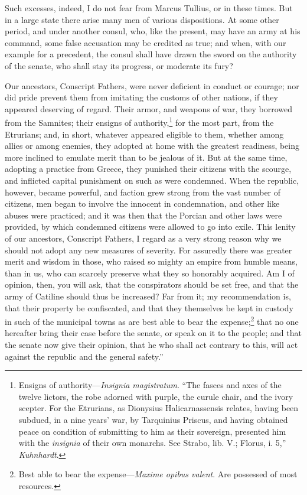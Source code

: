 Such excesses, indeed, I do not fear from Marcus Tullius, or in these
times. But in a large state there arise many men of various
dispositions. At some other period, and under another consul, who,
like the present, may have an army at his command, some false
accusation may be credited as true; and when, with our example for a
precedent, the consul shall have drawn the sword on the authority of
the senate, who shall stay its progress, or moderate its fury?

Our ancestors, Conscript Fathers, were never deficient in conduct or
courage; nor did pride prevent them from imitating the customs of
other nations, if they appeared deserving of regard. Their armor, and
weapons of war, they borrowed from the Samnites; their ensigns of
authority,\footnote{Ensigns of authority—\emph{Insignia magistratum}. ``The fasces and
axes of the twelve lictors, the robe adorned with purple, the curule
chair, and the ivory scepter. For the Etrurians, as Dionysius
Halicarnassensis relates, having been subdued, in a nine years' war,
by Tarquinius Priscus, and having obtained peace on condition of
submitting to him as their sovereign, presented him with the
\emph{insignia} of their own monarchs. See Strabo, lib. V.; Florus, i. 5,''
\emph{Kuhnhardt}.} for the most part, from the Etrurians; and, in short,
whatever appeared eligible to them, whether among allies or among
enemies, they adopted at home with the greatest readiness, being more
inclined to emulate merit than to be jealous of it. But at the same
time, adopting a practice from Greece, they punished their citizens
with the scourge, and inflicted capital punishment on such as were
condemned. When the republic, however, became powerful, and faction
grew strong from the vast number of citizens, men began to involve the
innocent in condemnation, and other like abuses were practiced; and it
was then that the Porcian and other laws were provided, by which
condemned citizens were allowed to go into exile. This lenity of our
ancestors, Conscript Fathers, I regard as a very strong reason why we
should not adopt any new measures of severity. For assuredly there was
greater merit and wisdom in those, who raised so mighty an empire from
humble means, than in us, who can scarcely preserve what they so
honorably acquired. Am I of opinion, then, you will ask, that the
conspirators should be set free, and that the army of Catiline should
thus be increased? Far from it; my recommendation is, that their
property be confiscated, and that they themselves be kept in custody
in such of the municipal towns as are best able to bear the
expense;\footnote{Best able to bear the expense—\emph{Maxime opibus valent}. Are
possessed of most resources.} that no one hereafter bring their case before the
senate, or speak on it to the people; and that the senate now give
their opinion, that he who shall act contrary to this, will act
against the republic and the general safety.''

